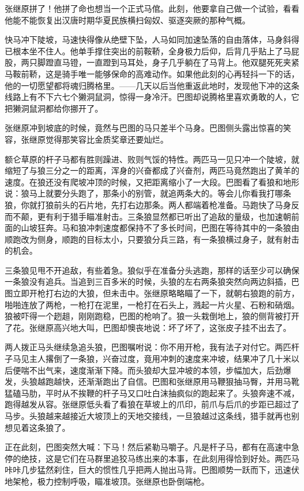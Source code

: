 \par 张继原拼了！他拼了命也想当一个正式马倌。此刻，他要拿自己做一个试验，看看他能不能恢复出汉唐时期华夏民族横扫匈奴、驱逐突厥的那种气概。
\par 快马冲下陡坡，马速快得像从绝壁下坠，人马如同加速坠落的自由落体，马身斜得已根本坐不住人。他单手撑住突出的前鞍鞒，全身极力后仰，后背几乎贴上了马屁股，两只脚蹬直马镫，一直蹬到马耳处，身子几乎躺在了马背上。他双腿死死夹紧马鞍前鞒，这是骑手唯一能够保命的高难动作。如果他此刻的心再轻抖一下的话，他的一切愿望都将魂归腾格里。——几天以后当他重返此地时，发现他下冲的这条线路上有不下六七个獭洞鼠洞，惊得一身冷汗。巴图却说腾格里喜欢勇敢的人，它把獭洞鼠洞都给你挪开了。
\par 张继原冲到坡底的时候，竟然与巴图的马只差半个马身。巴图侧头露出惊喜的笑容，张继原觉得那笑容比金质奖章还要灿烂。
\par 额仑草原的杆子马都有胜则躁进、败则气馁的特性。两匹马一见只冲一个陡坡，就缩短了与狼三分之一的距离，浑身的兴奋都成了兴奋剂，两匹马竟然跑出了黄羊的速度。在狼还没有爬坡冲顶的时候，又把距离缩小了一大段。巴图看了看狼和地形说：狼马上就要分头跑了，那条小的别管，就追两条大的。等会儿你看我打哪条狼，你就打狼前头的石片地，先打右边那条。两人都端着枪准备。马跑快了马身反而不颠，更有利于猎手瞄准射击。三条狼显然都已听出了追敌的量级，也加速朝前面的山坡狂奔。马和狼冲刺速度都保持不了多长时间，巴图在等待其中的一条狼由顺跑改为侧身，顺跑的目标太小，只要狼分兵三路，有一条狼横过身子，就有射击的机会。
\par 三条狼见甩不开追敌，有些着急。狼似乎在准备分头逃跑，那样的话至少可以确保一条狼没有追兵。当追到三百多米的时候，头狼的左右两条狼突然向两边斜插，巴图立即开枪打右边的大狼，但未击中。张继原略略瞄了一下，就朝右狼跑的前方，啪啪连放了两枪，一枪打在泥里，一枪打在石头上，溅起一片火星、石粉和硝烟。狼被吓得一个趔趄，刚刚跑稳，巴图的枪响了。狼一头栽倒地上，狼的侧背被打开了花。张继原高兴地大叫，巴图却懊丧地说：坏了坏了，这张皮子挂不出去了。
\par 两人拨正马头继续急追头狼，巴图嘱咐说：你不用开枪，我有法子对付它。两匹杆子马见主人撂倒了一条狼，兴奋过度，竟用冲刺的速度来冲坡，结果冲了几十米以后便喘不出气来，速度渐渐下降。而头狼却大显冲坡的本领，步幅加大，后劲爆发，头狼越跑越快，还渐渐跑出了自信。巴图和张继原用马鞭狠抽马臀，并用马靴猛磕马肋，平时从不挨鞭的杆子马又口吐白沫抽疯似的跑起来了。头狼奔速不减，跑得越发从容。张继原低头看了看狼在草坡上的爪印，前爪与后爪的步距已超过了马步。头狼越来越接近大坡顶上的天地交接线，一旦狼越过这条线，猎手就再也别想见着这条狼了。
\par 正在此刻，巴图突然大喊：下马！然后紧勒马嚼子。凡是杆子马，都有在高速中急停的绝技，这是它们在马群里追狡马练出来的本事，在此刻用得恰到好处。两匹马咔咔几步猛然刹住，巨大的惯性几乎把两人抛出马背。巴图顺势一跃而下，迅速伏地架枪，极力控制呼吸，瞄准坡顶。张继原也卧倒端枪。
